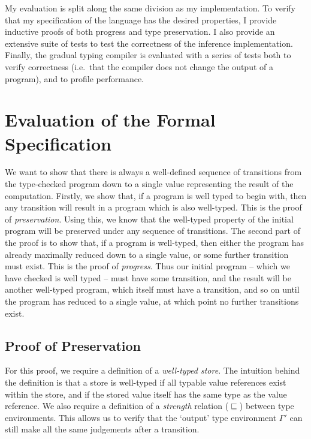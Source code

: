 \documentclass[12pt,a4paper,twoside,openright]{report}
\theoremstyle{definition}
\theoremstyle{dotless}
\begin{document}
My evaluation is split along the same division as my implementation. To verify
that my specification of the language has the desired properties, I provide
inductive proofs of both progress and type preservation.  I also provide an
extensive suite of tests to test the correctness of the inference
implementation. Finally, the gradual typing compiler is evaluated with a series
of tests both to verify correctness (i.e.~that the compiler does not change the
output of a program), and to profile performance.

\section{Evaluation of the Formal Specification}

We want to show that there is always a well-defined sequence of transitions
from the type-checked program down to a single value
representing the result of the computation. Firstly, we show that, if a program
is well typed to begin with, then any transition will result in a program which
is also well-typed. This is the proof of \textit{preservation}.  Using this, we
know that the well-typed property of the initial program will be preserved
under any sequence of transitions. The second part of the proof is to show
that, if a program is well-typed, then either the program has already maximally
reduced down to a single value, or some further transition must exist. This is
the proof of \textit{progress}. Thus our initial program -- which we have
checked is well typed -- must have some transition, and the result will be
another well-typed program, which itself must have a transition, and so on
until the program has reduced to a single value, at which point no further
transitions exist.

\subsection{Proof of Preservation}

For this proof, we require a definition of a \textit{well-typed store}.  The
intuition behind the definition is that a store is well-typed if all typable
value references exist within the store, and if the stored value
itself has the same type as the value reference. We also require a definition
of a \textit{strength} relation ($\sqsubseteq$) between type environments. This
allows us to verify that the `output' type environment $\Gamma'$ 
can still make all the same judgements after a transition.
\end{document}
